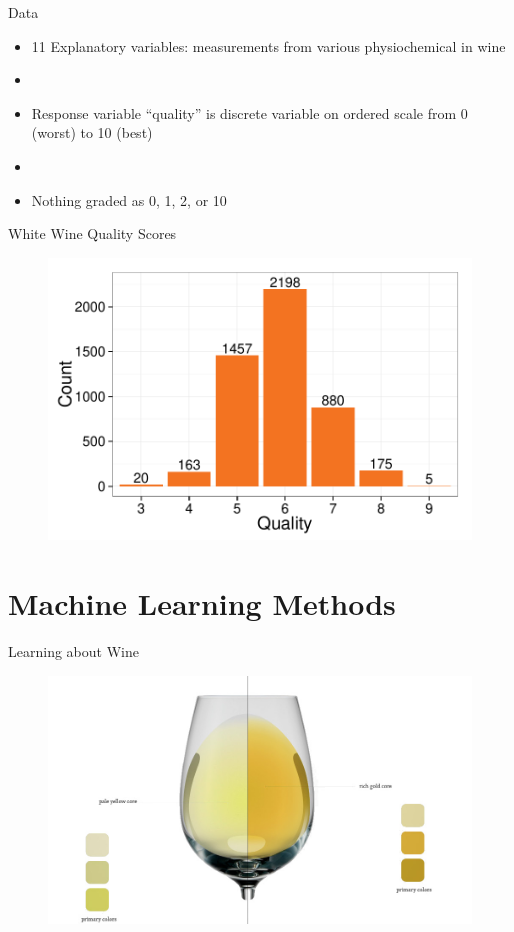 \documentclass{beamer}
\begin{document}
\begin{frame}{Data}
\begin{itemize}
	
	\item 11 Explanatory variables: measurements from various physiochemical in wine
	\item[]
	\item Response variable ``quality'' is discrete variable on ordered scale from 0 (worst) to 10 (best)
	\item[]
	\item Nothing graded as 0, 1, 2, or 10	
\end{itemize}
\end{frame}

\begin{frame}{White Wine Quality Scores}
\begin{figure}
	\centering
	\includegraphics[width=\textwidth]{../images/white_hist.pdf}
\end{figure}
\end{frame}

\section{Machine Learning Methods}

\begin{frame}{Learning about Wine}
	\begin{figure}
		\centering
		\includegraphics[width=\textwidth]{../images/matching.jpg}
	\end{figure}
\end{frame}
\end{document}
